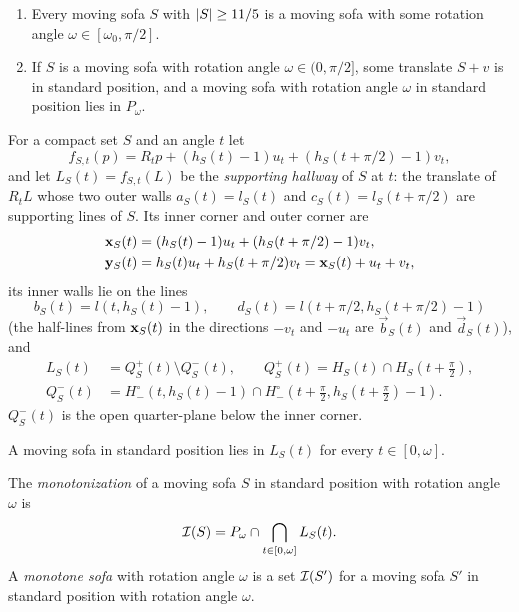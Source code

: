 \begin{fact}\label{fact:angle}
\begin{enumerate}[label=(\alph*)]
\item Every moving sofa $S$ with $\lvert S\rvert\ge 11/5$ is a moving sofa with some
rotation angle $\omega\in[\omega_0,\pi/2]$. 
\item If $S$ is a moving sofa with rotation angle $\omega\in(0,\pi/2]$, some
translate $S+v$ is in standard position, and a moving sofa with rotation angle
$\omega$ in standard position lies in $P_\omega$. 
\end{enumerate}
\end{fact}

\begin{definition}\label{def:supporting}
For a compact set $S$ and an angle $t$ let
\[
  f_{S,t}(p)=R_tp+(h_S(t)-1)u_t+(h_S(t+\pi/2)-1)v_t ,
\]
and let $L_S(t)=f_{S,t}(L)$ be the \emph{supporting hallway} of $S$ at $t$: the
translate of $R_tL$ whose two outer walls $a_S(t)=l_S(t)$ and
$c_S(t)=l_S(t+\pi/2)$ are supporting lines of $S$. Its inner corner and outer
corner are
\begin{align*}
  \mathbf{x}_S(t)&=(h_S(t)-1)u_t+(h_S(t+\pi/2)-1)v_t,\\
  \mathbf{y}_S(t)&=h_S(t)u_t+h_S(t+\pi/2)v_t=\mathbf{x}_S(t)+u_t+v_t,
\end{align*}
its inner walls lie on the lines
\[
  b_S(t)=l(t,h_S(t)-1),\qquad d_S(t)=l(t+\pi/2,h_S(t+\pi/2)-1)
\]
(the half-lines from $\mathbf{x}_S(t)$ in the directions $-v_t$ and $-u_t$ are
$\vec b_S(t)$ and $\vec d_S(t)$), and
\begin{align*}
  L_S(t)&=Q_S^+(t)\setminus Q_S^-(t),\qquad
  Q_S^+(t)=H_S(t)\cap H_S(t+\tfrac\pi2),\\
  Q_S^-(t)&=H^\circ_-(t,h_S(t)-1)\cap H^\circ_-(t+\tfrac\pi2,h_S(t+\tfrac\pi2)
    -1).
\end{align*}
$Q_S^-(t)$ is the open quarter-plane below the inner corner.
\end{definition}

A moving sofa in standard position lies in $L_S(t)$ for every $t\in[0,\omega]$.

\begin{definition}\label{def:monotone}
The \emph{monotonization} of a moving sofa $S$ in standard position with
rotation angle $\omega$ is
\[
  \mathcal{I}(S)=P_\omega\cap\bigcap_{t\in[0,\omega]}L_S(t).
\]
A \emph{monotone sofa} with rotation angle $\omega$ is a set $\mathcal{I}(S')$ for a
moving sofa $S'$ in standard position with rotation angle $\omega$.
\end{definition}

